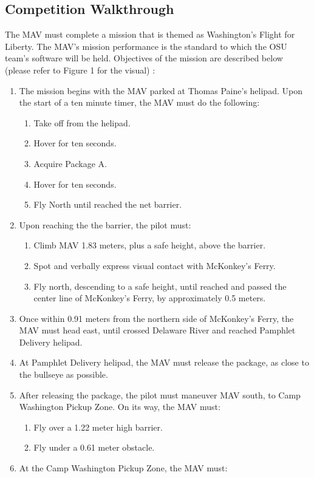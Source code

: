 \documentclass[onecolumn, draftclsnofoot, 10pt, compsoc]{IEEEtran}
\begin{document}
\subsection{Competition Walkthrough}
The MAV must complete a mission that is themed as Washington’s Flight for Liberty. The MAV's mission performance is the standard to which the OSU team's software will be held. Objectives of the mission are described below (please refer to Figure 1 for the visual) \cite{vfs}:
\begin{enumerate}
\item The mission begins with the MAV parked at Thomas Paine’s helipad. Upon the start of a ten minute timer, the MAV must do the following:
\begin{enumerate}
\item Take off from the helipad.
\item Hover for ten seconds.
\item Acquire Package A.
\item Hover for ten seconds.
\item Fly North until reached the net barrier.
\end{enumerate}
\item Upon reaching the the barrier, the pilot must:
\begin{enumerate}
\item Climb MAV 1.83 meters, plus a safe height, above the barrier.
\item Spot and verbally express visual contact with McKonkey’s Ferry.
\item Fly north, descending to a safe height, until reached and passed the center line of McKonkey’s Ferry, by approximately 0.5 meters.
\end{enumerate}
\item Once within 0.91 meters from the northern side of McKonkey’s Ferry, the MAV must head east, until crossed Delaware River and reached Pamphlet Delivery helipad.
\item At Pamphlet Delivery helipad, the MAV must release the package, as close to the bullseye as possible.
\item After releasing the package, the pilot must maneuver MAV south, to Camp Washington Pickup Zone. On its way, the MAV must:
\begin{enumerate}
\item Fly over a 1.22 meter high barrier.
\item Fly under a 0.61 meter obstacle.
\end{enumerate}
\item At the Camp Washington Pickup Zone, the MAV must:

\end{enumerate}
\end{document}
